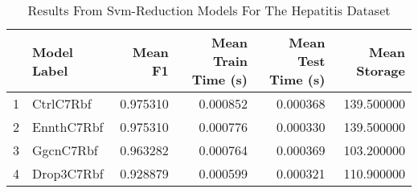 \begin{table}
\centering
\caption{Results From Svm-Reduction Models For The Hepatitis Dataset}
\label{tab:svm_reduction_results_hepatitis}
\begin{tabular}{rlrrrr}
\toprule
 & Model Label & Mean F1 & Mean Train Time (s) & Mean Test Time (s) & Mean Storage \\
\midrule
1 & CtrlC7Rbf & 0.975310 & 0.000852 & 0.000368 & 139.500000 \\
2 & EnnthC7Rbf & 0.975310 & 0.000776 & 0.000330 & 139.500000 \\
3 & GgcnC7Rbf & 0.963282 & 0.000764 & 0.000369 & 103.200000 \\
4 & Drop3C7Rbf & 0.928879 & 0.000599 & 0.000321 & 110.900000 \\
\bottomrule
\end{tabular}
\end{table}
